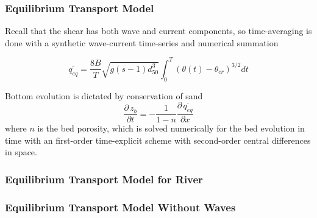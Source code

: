\documentclass[aspectratio=169]{beamer}
\newcommand{\pdv}[2]{\frac{\partial \, #1}{\partial #2}}
\begin{document}
\begin{frame}
  \frametitle{Equilibrium Transport Model}


Recall that the shear has both wave and
current components, so time-averaging is done with a synthetic wave-current time-series and numerical summation

\begin{equation*}
  \overline{q_{eq}} = \frac{8 B}{T} \sqrt{g (s-1) d_{50}^3}\int_0^T(\theta(t)-\theta_{cr})^{3/2} dt 
\end{equation*}

Bottom evolution is dictated by conservation of sand
\begin{equation*}
\pdv{z_b}{t} = -\frac{1}{1-n} \pdv{\overline{q_{eq}}}{x}
\end{equation*}
where $n$ is the bed porosity, which is solved numerically for the bed
evolution in time with an first-order time-explicit scheme with
second-order central differences in space.


\end{frame}
\begin{frame}
  \frametitle{Equilibrium Transport Model for River} 
  \centering
\end{frame}
\begin{frame}
  \frametitle{Equilibrium Transport Model Without Waves} 
  \centering
\end{frame}
\end{document}
